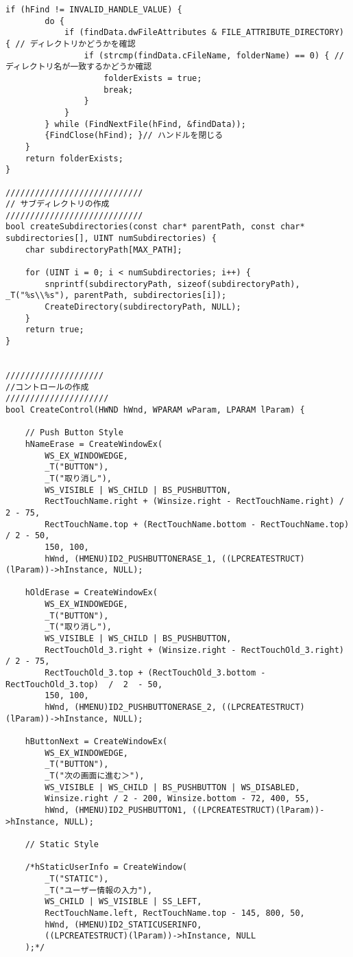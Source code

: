 \begin{lstlisting}[caption=UserInfoWindow.cpp]
	if (hFind != INVALID_HANDLE_VALUE) {
		do {
			if (findData.dwFileAttributes & FILE_ATTRIBUTE_DIRECTORY) { // ディレクトリかどうかを確認
				if (strcmp(findData.cFileName, folderName) == 0) { // ディレクトリ名が一致するかどうか確認
					folderExists = true;
					break;
				}
			}
		} while (FindNextFile(hFind, &findData));
		{FindClose(hFind); }// ハンドルを閉じる
	}
	return folderExists;
}

////////////////////////////
// サブディレクトリの作成
////////////////////////////
bool createSubdirectories(const char* parentPath, const char* subdirectories[], UINT numSubdirectories) {
	char subdirectoryPath[MAX_PATH];

	for (UINT i = 0; i < numSubdirectories; i++) {
		snprintf(subdirectoryPath, sizeof(subdirectoryPath), _T("%s\\%s"), parentPath, subdirectories[i]);
		CreateDirectory(subdirectoryPath, NULL);
	}
	return true;
}


////////////////////
//コントロールの作成
/////////////////////
bool CreateControl(HWND hWnd, WPARAM wParam, LPARAM lParam) {

	// Push Button Style
	hNameErase = CreateWindowEx(
		WS_EX_WINDOWEDGE,
		_T("BUTTON"),
		_T("取り消し"),
		WS_VISIBLE | WS_CHILD | BS_PUSHBUTTON,
		RectTouchName.right + (Winsize.right - RectTouchName.right) / 2 - 75, 
		RectTouchName.top + (RectTouchName.bottom - RectTouchName.top) / 2 - 50, 
		150, 100,
		hWnd, (HMENU)ID2_PUSHBUTTONERASE_1, ((LPCREATESTRUCT)(lParam))->hInstance, NULL);

	hOldErase = CreateWindowEx(
		WS_EX_WINDOWEDGE,
		_T("BUTTON"),
		_T("取り消し"),
		WS_VISIBLE | WS_CHILD | BS_PUSHBUTTON,
		RectTouchOld_3.right + (Winsize.right - RectTouchOld_3.right) / 2 - 75, 
		RectTouchOld_3.top + (RectTouchOld_3.bottom - RectTouchOld_3.top)  /  2  - 50, 
		150, 100,
		hWnd, (HMENU)ID2_PUSHBUTTONERASE_2, ((LPCREATESTRUCT)(lParam))->hInstance, NULL);

	hButtonNext = CreateWindowEx(
		WS_EX_WINDOWEDGE,
		_T("BUTTON"),
		_T("次の画面に進む＞"),
		WS_VISIBLE | WS_CHILD | BS_PUSHBUTTON | WS_DISABLED,
		Winsize.right / 2 - 200, Winsize.bottom - 72, 400, 55,
		hWnd, (HMENU)ID2_PUSHBUTTON1, ((LPCREATESTRUCT)(lParam))->hInstance, NULL);

	// Static Style

	/*hStaticUserInfo = CreateWindow(
		_T("STATIC"),
		_T("ユーザー情報の入力"),
		WS_CHILD | WS_VISIBLE | SS_LEFT,
		RectTouchName.left, RectTouchName.top - 145, 800, 50,
		hWnd, (HMENU)ID2_STATICUSERINFO,
		((LPCREATESTRUCT)(lParam))->hInstance, NULL
	);*/


\end{lstlisting}
